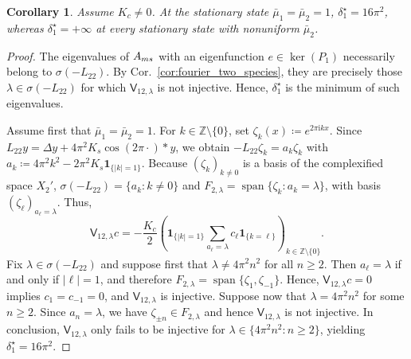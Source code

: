 \documentclass[10pt,a4paper]{amsart}
\newtheorem{corollary}{Corollary}
\newcommand{\ind}{\mathbf{1}}
\begin{document}
\begin{corollary}
    \label{cor:cosine_visibility_dichotomy}
    Assume $K_c \neq 0$.
    At the stationary state $\bar\mu_1 = \bar\mu_2 = 1$, $\delta_1^\star = 16\pi^2$, whereas $\delta_1^\star = +\infty$ at every stationary state with nonuniform $\bar\mu_2$.
\end{corollary}

\begin{proof}
    The eigenvalues of $A_{\rm ms}$ with an eigenfunction $e \in \ker(P_1)$ necessarily belong to $\sigma(-L_{22})$.
    By Cor.~\ref{cor:fourier_two_species}, they are precisely those $\lambda \in \sigma(-L_{22})$ for which $\mathsf{V}_{12,\lambda}$ is not injective.
    Hence, $\delta_1^\star$ is the minimum of such eigenvalues.
    
    Assume first that $\bar\mu_1 = \bar\mu_2 = 1$.
    For $k \in \mathbb{Z} \setminus \{0\}$, set $\zeta_k(x) \coloneqq e^{2\pi \mathrm{i} k x}$.
    Since $L_{22}y = \Delta y + 4 \pi^2 K_s \cos(2\pi\cdot) \ast y$, we obtain $-L_{22}\zeta_k = a_k \zeta_k$ with $a_k \coloneqq 4 \pi^2 k^2 - 2 \pi^2 K_s \mathbf{1}_{\{|k|=1\}}$.
    Because $(\zeta_k)_{k \neq 0}$ is a basis of the complexified space $X_2'$, $\sigma(-L_{22}) = \{a_k : k \neq 0\}$ and $F_{2,\lambda} = \operatorname{span}\{\zeta_k : a_k = \lambda\}$, with basis $(\zeta_\ell)_{a_\ell = \lambda}$.
    Thus,
    \[
    \mathsf{V}_{12,\lambda}c = -\frac{K_c}{2} \left(\mathbf{1}_{\{|k|=1\}} \sum_{a_\ell = \lambda} c_\ell \ind_{\{k=\ell\}} \right)_{k \in \mathbb{Z} \setminus \{0\}}.
    \]
    Fix $\lambda \in \sigma(-L_{22})$ and suppose first that $\lambda \neq 4 \pi^2 n^2$ for all $n \ge 2$. 
    Then $a_\ell = \lambda$ if and only if $|\ell| = 1$, and therefore $F_{2,\lambda} = \operatorname{span}\{\zeta_1, \zeta_{-1}\}$.
    Hence, $\mathsf{V}_{12,\lambda}c = 0$ implies $c_1 = c_{-1} = 0$, and $\mathsf{V}_{12,\lambda}$ is injective.
    Suppose now that $\lambda = 4 \pi^2 n^2$ for some $n \ge 2$.
    Since $a_n = \lambda$, we have $\zeta_{\pm n} \in F_{2,\lambda}$ and hence $\mathsf{V}_{12,\lambda}$ is not injective.
    In conclusion, $\mathsf{V}_{12,\lambda}$ only fails to be injective for $\lambda \in \{4 \pi^2 n^2 : n \ge 2\}$, yielding $\delta_1^\star = 16\pi^2$.


\end{proof}
\end{document}
